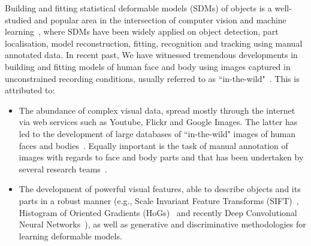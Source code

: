 Building and fitting statistical deformable models (SDMs) of objects is a well-studied and popular area in the intersection of computer vision and machine learning~\cite{Cootes1995, Cootes2001, Matthews2004, Saragih2011, Belhumeur2011, Zhu2012, Xiong2013}, where SDMs have been widely applied on object detection, part localisation, model reconstruction, fitting, recognition and tracking using manual annotated data. In recent past, We have witnessed tremendous developments in building and fitting models of human face and body using images captured in unconstrained recording conditions, usually referred to as ``in-the-wild"~\cite{Belhumeur2011, Cao2012, Zhu2012, Xiong2013, Asthana2013, Tzimiropoulos2014, Asthana2014}. This is attributed to: 
\begin{itemize}

\item The abundance of complex visual data, spread mostly through the internet via web services such as Youtube, Flickr and Google Images. The latter has led to the development of large databases of ``in-the-wild" images of human faces and bodies~\cite{Belhumeur2011, Le2012, Zhu2012, Burgos2013}. Equally important is the task of manual annotation of images with regards to face and body parts and that has been undertaken by several research teams~\cite{sagonas_iccv_300w_2013}.

\item The development of powerful visual features, able to describe objects and its parts in a robust manner (e.g., Scale Invariant Feature Transforms (SIFT)~\cite{lowe1999object}, Histogram of Oriented Gradients (HoGs)~\cite{Dalal2005} and recently Deep Convolutional Neural Networks~\cite{sermanet2013overfeat}), as well as generative and discriminative methodologies for learning deformable models. 

\end{itemize}

